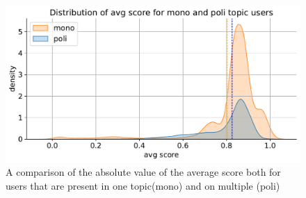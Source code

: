 \begin{figure}
    \centering
    \includegraphics[width=0.8\linewidth]{Chapter5/figures/avg_score_mono_poli.pdf}
    \caption{A comparison of the absolute value of the average score both for users that are present in one topic(mono) and on multiple (poli)}
    \label{fig:monopoli}
\end{figure}

